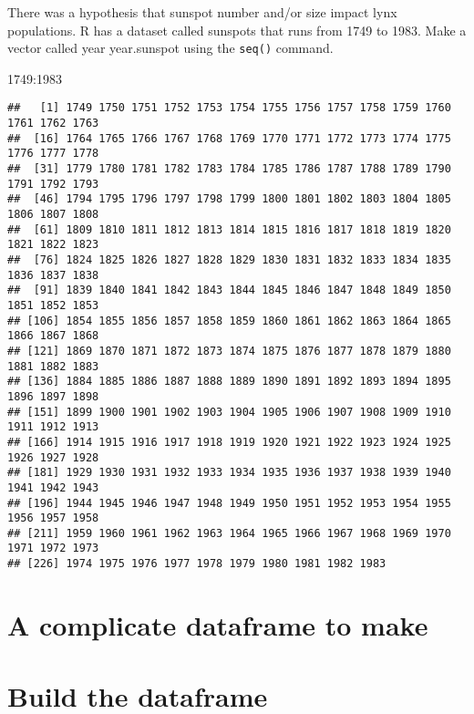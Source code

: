 \documentclass[
]{book}
\newenvironment{Shaded}{\begin{snugshade}}{\end{snugshade}}
\newcommand{\DecValTok}[1]{\textcolor[rgb]{0.00,0.00,0.81}{#1}}
\newcommand{\SpecialCharTok}[1]{\textcolor[rgb]{0.00,0.00,0.00}{#1}}
\begin{document}
There was a hypothesis that sunspot number and/or size impact lynx populations. R has a dataset called sunspots that runs from 1749 to 1983. Make a vector called year year.sunspot using the \texttt{seq()} command.

\begin{Shaded}
\begin{Highlighting}[]
\DecValTok{1749}\SpecialCharTok{:}\DecValTok{1983}
\end{Highlighting}
\end{Shaded}

\begin{verbatim}
##   [1] 1749 1750 1751 1752 1753 1754 1755 1756 1757 1758 1759 1760 1761 1762 1763
##  [16] 1764 1765 1766 1767 1768 1769 1770 1771 1772 1773 1774 1775 1776 1777 1778
##  [31] 1779 1780 1781 1782 1783 1784 1785 1786 1787 1788 1789 1790 1791 1792 1793
##  [46] 1794 1795 1796 1797 1798 1799 1800 1801 1802 1803 1804 1805 1806 1807 1808
##  [61] 1809 1810 1811 1812 1813 1814 1815 1816 1817 1818 1819 1820 1821 1822 1823
##  [76] 1824 1825 1826 1827 1828 1829 1830 1831 1832 1833 1834 1835 1836 1837 1838
##  [91] 1839 1840 1841 1842 1843 1844 1845 1846 1847 1848 1849 1850 1851 1852 1853
## [106] 1854 1855 1856 1857 1858 1859 1860 1861 1862 1863 1864 1865 1866 1867 1868
## [121] 1869 1870 1871 1872 1873 1874 1875 1876 1877 1878 1879 1880 1881 1882 1883
## [136] 1884 1885 1886 1887 1888 1889 1890 1891 1892 1893 1894 1895 1896 1897 1898
## [151] 1899 1900 1901 1902 1903 1904 1905 1906 1907 1908 1909 1910 1911 1912 1913
## [166] 1914 1915 1916 1917 1918 1919 1920 1921 1922 1923 1924 1925 1926 1927 1928
## [181] 1929 1930 1931 1932 1933 1934 1935 1936 1937 1938 1939 1940 1941 1942 1943
## [196] 1944 1945 1946 1947 1948 1949 1950 1951 1952 1953 1954 1955 1956 1957 1958
## [211] 1959 1960 1961 1962 1963 1964 1965 1966 1967 1968 1969 1970 1971 1972 1973
## [226] 1974 1975 1976 1977 1978 1979 1980 1981 1982 1983
\end{verbatim}

\hypertarget{a-complicate-dataframe-to-make}{%
\section{A complicate dataframe to make}\label{a-complicate-dataframe-to-make}}

\hypertarget{build-the-dataframe}{%
\section{Build the dataframe}\label{build-the-dataframe}}
\end{document}
